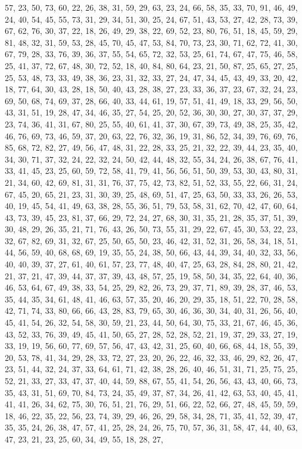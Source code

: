 \documentclass[
]{article}
\begin{document}
\begin{Schunk}
\begin{Soutput}
57, 23, 50, 73, 60, 22, 26, 38, 31, 59, 29, 63, 23, 24, 66, 58, 35, 33, 70, 91, 46, 49, 24, 40, 54, 45, 55, 73, 31, 29, 34, 51, 30, 25, 24, 67, 51, 43, 53, 27, 42, 28, 73, 39, 67, 62, 76, 30, 37, 22, 18, 26, 49, 29, 38, 22, 69, 52, 23, 80, 76, 51, 18, 45, 59, 29, 81, 48, 32, 31, 59, 53, 28, 45, 70, 45, 47, 53, 84, 70, 73, 23, 30, 71, 62, 72, 41, 30, 67, 79, 28, 33, 76, 39, 36, 37, 55, 54, 65, 72, 32, 53, 25, 61, 74, 67, 47, 75, 46, 58, 25, 41, 37, 72, 67, 48, 30, 72, 52, 18, 40, 84, 80, 64, 23, 21, 50, 87, 25, 65, 27, 25, 25, 53, 48, 73, 33, 49, 38, 36, 23, 31, 32, 33, 27, 24, 47, 34, 45, 43, 49, 33, 20, 42, 18, 77, 64, 30, 43, 28, 18, 50, 40, 43, 28, 38, 27, 23, 33, 36, 37, 23, 67, 32, 24, 23, 69, 50, 68, 74, 69, 37, 28, 66, 40, 33, 44, 61, 19, 57, 51, 41, 49, 18, 33, 29, 56, 50, 43, 31, 51, 19, 28, 47, 34, 46, 35, 27, 54, 25, 20, 52, 36, 30, 30, 27, 30, 37, 37, 29, 23, 74, 36, 41, 31, 67, 80, 25, 55, 40, 61, 41, 37, 30, 67, 39, 73, 49, 38, 25, 35, 42, 46, 76, 69, 73, 46, 59, 37, 20, 63, 22, 76, 32, 36, 19, 31, 86, 52, 34, 39, 76, 69, 76, 85, 68, 72, 82, 27, 49, 56, 47, 48, 31, 22, 28, 33, 25, 21, 32, 22, 39, 44, 23, 35, 40, 34, 30, 71, 37, 32, 24, 22, 32, 24, 50, 42, 44, 48, 32, 55, 34, 24, 26, 38, 67, 76, 41, 33, 41, 45, 23, 25, 60, 59, 72, 58, 41, 79, 41, 56, 56, 51, 50, 39, 53, 30, 43, 80, 31, 21, 34, 60, 42, 69, 81, 31, 31, 76, 37, 75, 42, 73, 82, 51, 52, 33, 55, 22, 66, 31, 24, 67, 45, 20, 65, 21, 23, 31, 30, 39, 25, 48, 69, 51, 47, 25, 63, 50, 33, 33, 26, 26, 53, 40, 19, 45, 54, 41, 49, 63, 38, 28, 55, 36, 51, 79, 53, 58, 31, 62, 70, 42, 47, 60, 64, 43, 73, 39, 45, 23, 81, 37, 66, 29, 72, 24, 27, 68, 30, 31, 35, 21, 28, 35, 37, 51, 39, 30, 48, 29, 26, 35, 21, 71, 76, 43, 26, 50, 73, 55, 31, 29, 22, 67, 45, 30, 53, 22, 23, 32, 67, 82, 69, 31, 32, 67, 25, 50, 65, 50, 23, 46, 42, 31, 52, 31, 26, 58, 34, 18, 51, 44, 56, 59, 40, 68, 68, 69, 19, 35, 55, 24, 38, 50, 66, 43, 44, 39, 34, 40, 32, 33, 56, 40, 40, 39, 37, 27, 61, 40, 61, 57, 23, 77, 48, 40, 47, 25, 63, 28, 84, 28, 80, 21, 42, 21, 37, 21, 47, 39, 44, 37, 37, 39, 43, 48, 57, 25, 19, 58, 50, 34, 35, 22, 64, 40, 36, 46, 53, 64, 67, 49, 38, 33, 54, 25, 29, 82, 26, 73, 29, 37, 71, 89, 39, 28, 37, 46, 53, 35, 44, 35, 34, 61, 48, 41, 46, 63, 57, 35, 20, 46, 20, 29, 35, 18, 51, 22, 70, 28, 58, 42, 71, 74, 33, 80, 66, 66, 43, 28, 83, 79, 65, 30, 46, 36, 30, 34, 40, 31, 26, 56, 40, 45, 41, 54, 26, 32, 54, 58, 30, 59, 21, 23, 44, 50, 64, 30, 75, 33, 21, 67, 46, 45, 36, 43, 52, 33, 76, 39, 49, 45, 41, 50, 65, 27, 28, 52, 28, 52, 21, 19, 37, 29, 33, 27, 19, 33, 19, 19, 56, 60, 77, 69, 57, 56, 47, 43, 42, 31, 25, 60, 40, 66, 68, 44, 18, 55, 39, 20, 53, 78, 41, 34, 29, 28, 33, 72, 27, 23, 20, 26, 22, 46, 32, 33, 46, 29, 82, 26, 47, 23, 51, 44, 32, 24, 37, 33, 64, 61, 71, 42, 38, 28, 26, 40, 46, 51, 31, 71, 25, 75, 25, 52, 21, 33, 27, 33, 47, 37, 40, 44, 59, 88, 67, 55, 41, 54, 26, 56, 43, 43, 40, 66, 73, 35, 43, 31, 51, 69, 70, 84, 73, 24, 35, 49, 37, 87, 34, 26, 41, 42, 63, 53, 40, 45, 41, 41, 41, 26, 34, 62, 75, 30, 76, 51, 21, 76, 29, 51, 66, 22, 52, 66, 27, 48, 45, 59, 59, 18, 46, 22, 35, 22, 56, 23, 74, 39, 29, 46, 26, 29, 58, 34, 28, 71, 35, 41, 52, 39, 47, 35, 35, 24, 26, 38, 47, 57, 41, 25, 28, 24, 26, 75, 70, 57, 36, 31, 58, 47, 44, 40, 63, 47, 23, 21, 23, 25, 60, 34, 49, 55, 18, 28, 27, 
\end{Soutput}
\end{Schunk}
\end{document}
